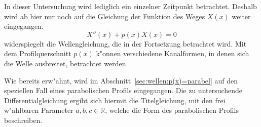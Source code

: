 In dieser Untersuchung wird lediglich ein einzelner Zeitpunkt betrachtet.
Deshalb wird ab hier nur noch auf die Gleichung der Funktion des Weges $X(x)$
weiter eingegangen.
\begin{equation*}
	X''(x) + p(x) X(x) = 0
\end{equation*}
widerspiegelt die Wellengleichung, die in der Fortsetzung betrachtet wird. Mit 
dem Profilquerschnitt $p(x)$ k"onnen verschiedene Kanalformen, in denen 
sich die Welle ausbreitet, betrachtet werden.

Wie bereits erw"ahnt, wird im Abschnitt~\ref{sec:wellen:p(x)=parabel} auf den 
speziellen Fall eines parabolischen Profils eingegangen. Die zu untersuchende 
Differentialgleichung ergibt sich hiermit die Titelgleichung, mit den frei 
w"ahlbaren Parameter ${a,b,c} \in \mathbb{R}$, welche die Form des 
parabolischen Profils beschreiben.

